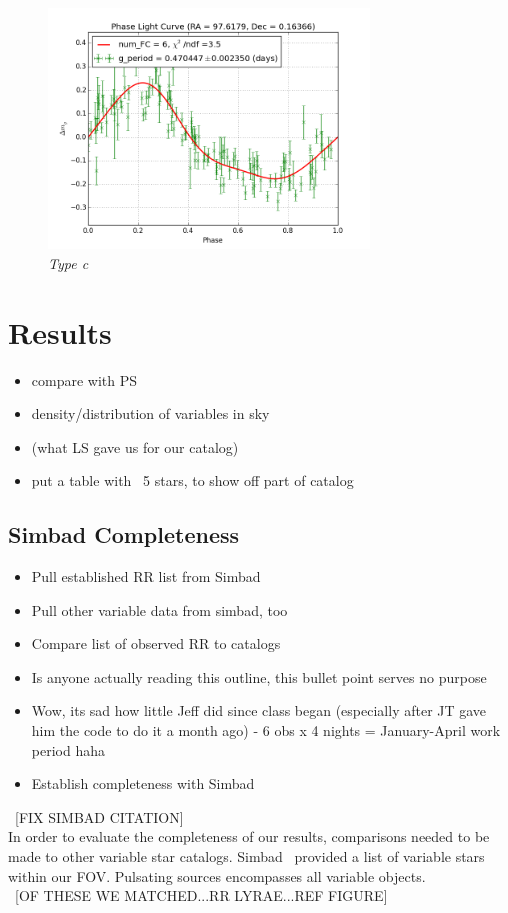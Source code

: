 \documentclass[aps,prl,twocolumn,superscriptaddress]{revtex4-1}
\begin{document}
\begin{figure}[H]
 \centering
 	\includegraphics[width=3.35in]{figures/FSP1_g_LC_rrrtest_p5_grp7.png}
 \caption{\it \small{Type c}}
 \label{fig:quartiles}
\end{figure}






\section{Results}
\begin{itemize}
	\item{} compare with PS
	\item{} density/distribution of variables in sky
	\item{} (what LS gave us for our catalog)
	\item{} put a table with ~5 stars, to show off part of catalog
\end{itemize}

\subsection{Simbad Completeness}
	\begin{itemize}
		\item{} Pull established RR list from Simbad
		\item{} Pull other variable data from simbad, too
		\item{} Compare list of observed RR to catalogs
		\item{} Is anyone actually reading this outline, this bullet point serves no purpose
		\item{} Wow, its sad how little Jeff did since class began (especially after JT gave him the code to do it a month ago) - 6 obs x 4 nights = January-April work period haha
		\item{} Establish completeness with Simbad
	\end{itemize}
~[FIX SIMBAD CITATION]\\
In order to evaluate the completeness of our results, comparisons needed to be made to other variable star catalogs.  Simbad~\cite{simbad} provided a list of variable stars within our FOV.  Pulsating sources encompasses all variable objects.  \\
~[OF THESE WE MATCHED...RR LYRAE...REF FIGURE]\\
\end{document}
